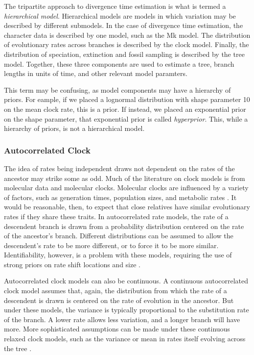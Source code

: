 \documentclass[11pt]{article}
\makeatletter
\newenvironment{boxedtext}[1]{%
  \begin{mdframed}[frametitle=#1,
    frametitlefont=\scshape\mdseries\sffamily,
    frametitlealignment=\centering,
    backgroundcolor=black!20,
    hidealllines=true,
    innerleftmargin=11\p@,innerrightmargin=11\p@,
    frametitleaboveskip=0.5\baselineskip,
    innerbottommargin=0.5\baselineskip,
    skipabove=\baselineskip,skipbelow=0.5\baselineskip]
}{%
  \end{mdframed}%
}
\makeatother
\begin{document}
\begin{boxedtext}{Hierarchical Models}

The tripartite approach to divergence time estimation is what is termed a \textit{hierarchical model}. 
Hierarchical models are models in which variation may be described by different submodels.
In the case of divergence time estimation, the character data is described by one model, such as the Mk model.
The distribution of evolutionary rates across branches is described by the clock model.
Finally, the distribution of speciation, extinction and fossil sampling is described by the tree model.
Together, these three components are used to estimate a tree, branch lengths in units of time, and other relevant model paramters.

This term may be confusing, as model components may have a hierarchy of priors. 
For eample, if we placed a lognormal distribution with shape parameter 10 on the mean clock rate, this is a prior.
If instead, we placed an exponential prior on the shape parameter, that exponential prior is called \textit{hyperprior}.
This, while a hierarchy of priors, is not a hierarchical model. 

\end{boxedtext}
\clearpage

\subsubsection{Autocorrelated Clock}
The idea of rates being independent draws not dependent on the rates of the ancestor may strike some as odd. 
Much of the literature on clock models is from molecular data and molecular clocks.
Molecular clocks are influenced by a variety of factors, such as generation times, population sizes, and metabolic rates \cite{bromham1996, gaut1992}.
It would be reasonable, then, to expect that close relatives have similar evolutionary rates if they share these traits.
In autocorrelated rate models, the rate of a descendent branch is drawn from a probability distribution \cite{Aris-Brosou2002}  centered on the rate of the ancestor's branch. 
Different distributions can be assumed to allow the descendent's rate to be more different, or to force it to be more similar. 
Identifiability, however, is a problem with these models, requiring the use of strong priors on rate shift locations and size \cite{Rannala2002, Ronquist2012a}.

Autocorrelated clock models can also be continuous.
A continuous autocorrelated clock model assumes that, again, the distribution from which the rate of a descendent is drawn is centered on the rate of evolution in the ancestor.
But under these models, the variance is typically proportional to the substitution rate of the branch. 
A lower rate allows less variation, and a longer branch will have more.
More sophisticated assumptions can be made under these continuous relaxed clock models, such as the variance or mean in rates itself evolving across the tree \cite{Thorne1998, Kishino2001, Thorne2002, Aris-Brosou2002, Aris-Brosou2003}.
\end{document}
